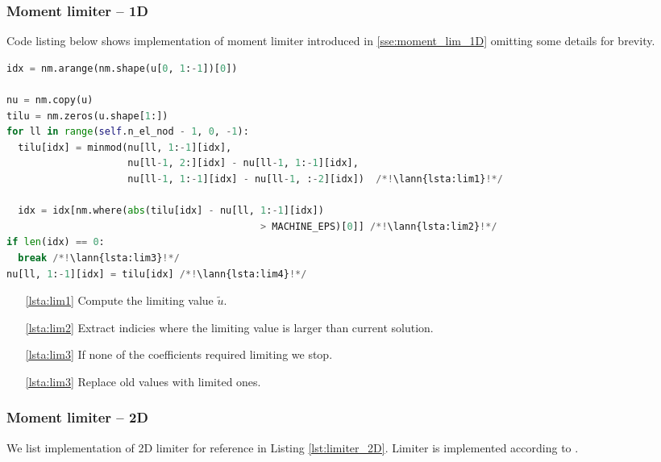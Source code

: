 \subsubsection{Moment limiter -- 1D}
\label{se:i_moment_lim_1D}
Code listing below shows implementation of moment limiter introduced in \ref{sse:moment_lim_1D} omitting some details 
for brevity.
\setcounter{lstannotation}{0}
\begin{lstlisting}[language=Python, caption=Moment limiter for 1D]
idx = nm.arange(nm.shape(u[0, 1:-1])[0])

nu = nm.copy(u)
tilu = nm.zeros(u.shape[1:])
for ll in range(self.n_el_nod - 1, 0, -1):
  tilu[idx] = minmod(nu[ll, 1:-1][idx], 
                     nu[ll-1, 2:][idx] - nu[ll-1, 1:-1][idx],
                     nu[ll-1, 1:-1][idx] - nu[ll-1, :-2][idx])  /*!\lann{lsta:lim1}!*/

  idx = idx[nm.where(abs(tilu[idx] - nu[ll, 1:-1][idx])
                                            > MACHINE_EPS)[0]] /*!\lann{lsta:lim2}!*/
if len(idx) == 0:
  break /*!\lann{lsta:lim3}!*/
nu[ll, 1:-1][idx] = tilu[idx] /*!\lann{lsta:lim4}!*/
\end{lstlisting}
\begin{itemize}
    \item [\ref{lsta:lim1}] Compute the limiting value $\tilde{u}$.
    \item [\ref{lsta:lim2}] Extract indicies where the limiting value is larger than 
    current solution.
    \item[\ref{lsta:lim3}] If none of the coefficients required limiting we stop.
    \item [\ref{lsta:lim3}] Replace old values with limited ones.
    
\end{itemize}

\subsubsection{Moment limiter -- 2D}
\label{se:i_moment_lim_2D}
We list implementation of 2D limiter for reference in Listing \ref{lst:limiter_2D}. Limiter is implemented according to .

